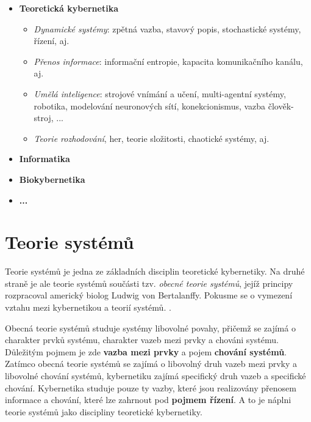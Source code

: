 {      \begin{itemize}\addtolength{\itemsep}{-0.1\baselineskip}
        \item \textbf{Teoretická kybernetika}
              \begin{itemize}\addtolength{\itemsep}{-0.1\baselineskip}
                \item \emph{Dynamické systémy}: zpětná vazba, stavový popis, stochastické systémy,
                      řízení, aj.
                \item \emph{Přenos informace}: informační entropie, kapacita komunikačního kanálu, 
                      aj. 
                \item \emph{Umělá inteligence}: strojové vnímání a učení, multi-agentní systémy, 
                      robotika, modelování neuronových sítí, konekcionismus, vazba člověk-stroj, ...
                \item \emph{Teorie rozhodování}, her, teorie složitosti, chaotické systémy, aj.
              \end{itemize}
        \item \textbf{Informatika}
        \item \textbf{Biokybernetika}
        \item \textbf{...}
      \end{itemize}
      
  \section{Teorie systémů}
     Teorie systémů je jedna ze základních disciplin teoretické kybernetiky. Na druhé straně je ale 
     teorie systémů součásti tzv. \emph{obecné teorie systémů}, jejíž principy rozpracoval americký 
     biolog Ludwig von Bertalanffy. Pokusme se o vymezení vztahu mezi kybernetikou a teorií systémů.
     \cite[s.~11]{Svarc1986}.
     
     Obecná teorie systémů studuje systémy libovolné povahy, přičemž se zajímá o charakter prvků 
     systému, charakter vazeb mezi prvky a chováni systému. Důležitým pojmem je zde \textbf{vazba 
     mezi prvky} a pojem \textbf{chování systémů}. Zatímco obecná teorie systémů se zajímá o 
     libovolný druh vazeb mezi prvky a libovolné chování systémů, kybernetiku zajímá specifický 
     druh vazeb a specifické chování. Kybernetika studuje pouze ty vazby, které jsou realizovány 
     přenosem informace a chování, které lze zahrnout pod \textbf{pojmem řízení}. A to je náplni 
     teorie systémů jako discipliny teoretické kybernetiky.
     
}
